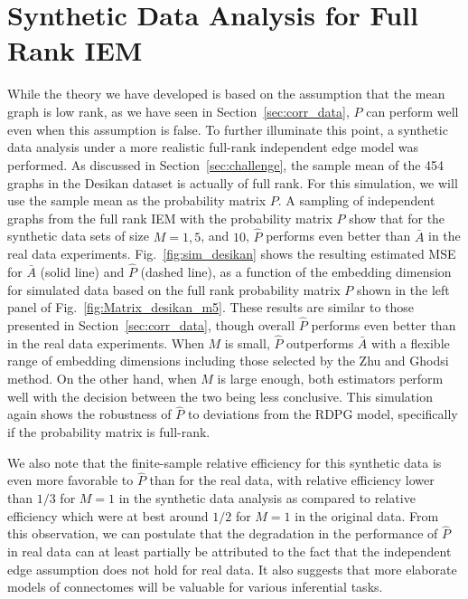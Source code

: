 \documentclass[journal,twoside,web]{ieeecolor}
\begin{document}
\section{Synthetic Data Analysis for Full Rank IEM}\label{sec:sim_iem}

While the theory we have developed is based on the assumption that the mean graph is low rank, as we have seen in Section~\ref{sec:corr_data}, $\hat{P}$ can perform well even when this assumption is false.
To further illuminate this point, a synthetic data analysis under a more realistic full-rank independent edge model was performed.
As discussed in Section~\ref{sec:challenge}, the sample mean of the 454 graphs in the Desikan dataset is actually of full rank.
For this simulation, we will use the sample mean as the probability matrix $P$.
A sampling of independent graphs from the full rank IEM with the probability matrix $P$ show that for the synthetic data sets of size $M = 1, 5$, and $10$, $\hat{P}$ performs even better than $\bar{A}$ in the real data experiments. 
Fig.~\ref{fig:sim_desikan} shows the resulting estimated MSE for $\bar{A}$ (solid line) and $\hat{P}$ (dashed line), as a function of the embedding dimension for simulated data based on the full rank probability matrix $P$ shown in the left panel of Fig.~\ref{fig:Matrix_desikan_m5}.
These results are similar to those presented in Section~\ref{sec:corr_data}, though overall $\hat{P}$ performs even better than in the real data experiments.
When $M$ is small, $\hat{P}$ outperforms $\bar{A}$ with a flexible range of embedding dimensions including those selected by the Zhu and Ghodsi method.
On the other hand, when $M$ is large enough, both estimators perform well with the decision between the two being less conclusive.
This simulation again shows the robustness of $\hat{P}$ to deviations from the RDPG model, specifically if the probability matrix is full-rank.

We also note that the finite-sample relative efficiency for this synthetic data is even more favorable to $\hat{P}$ than for the real data, with relative efficiency lower than $1/3$ for $M=1$ in the synthetic data analysis as compared to relative efficiency which were at best around $1/2$ for $M=1$ in the original data.
From this observation, we can postulate that the degradation in the performance of $\hat{P}$ in real data can at least partially be attributed to the fact that the independent edge assumption does not hold for real data.
It also suggests that more elaborate models of connectomes will be valuable for various inferential tasks.
\end{document}
